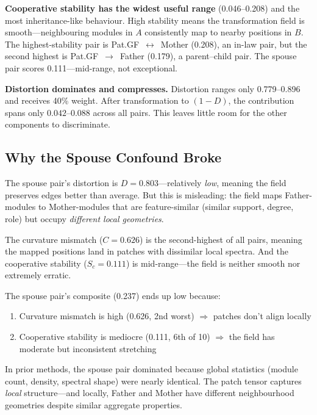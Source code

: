 \documentclass{../yalumba}
\begin{document}
\begin{keyfinding}
\textbf{Cooperative stability has the widest useful range} (0.046--0.208)
and the most inheritance-like behaviour.  High stability means the
transformation field is smooth---neighbouring modules in $A$ consistently
map to nearby positions in $B$.  The highest-stability pair is
Pat.GF~$\leftrightarrow$~Mother (0.208), an in-law pair, but the second
highest is Pat.GF~$\to$~Father (0.179), a parent--child pair.  The spouse
pair scores 0.111---mid-range, not exceptional.
\end{keyfinding}

\begin{limitation}
\textbf{Distortion dominates and compresses.}  Distortion ranges only
0.779--0.896 and receives 40\% weight.  After transformation to
$(1 - D)$, the contribution spans only $0.042$--$0.088$ across all pairs.
This leaves little room for the other components to discriminate.
\end{limitation}

\subsection{Why the Spouse Confound Broke}

The spouse pair's distortion is $D = 0.803$---relatively \emph{low}, meaning
the field preserves edges better than average.  But this is misleading:
the field maps Father-modules to Mother-modules that are feature-similar
(similar support, degree, role) but occupy \emph{different local geometries}.

The curvature mismatch ($C = 0.626$) is the second-highest of all pairs,
meaning the mapped positions land in patches with dissimilar local spectra.
And the cooperative stability ($S_c = 0.111$) is mid-range---the field is
neither smooth nor extremely erratic.

The spouse pair's composite (0.237) ends up low because:

\begin{enumerate}
  \item Curvature mismatch is high (0.626, 2nd worst) $\Rightarrow$
    patches don't align locally
  \item Cooperative stability is mediocre (0.111, 6th of 10) $\Rightarrow$
    the field has moderate but inconsistent stretching
\end{enumerate}

In prior methods, the spouse pair dominated because global statistics
(module count, density, spectral shape) were nearly identical.  The patch
tensor captures \emph{local} structure---and locally, Father and Mother
have different neighbourhood geometries despite similar aggregate properties.
\end{document}
